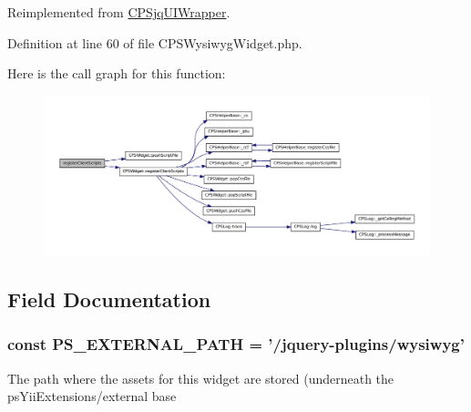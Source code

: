 Reimplemented from \hyperlink{classCPSjqUIWrapper_ac02a66bde8e72e4909137bf748edf665}{CPSjqUIWrapper}.



Definition at line 60 of file CPSWysiwygWidget.php.








Here is the call graph for this function:\nopagebreak
\begin{figure}[H]
\begin{center}
\leavevmode
\includegraphics[width=400pt]{classCPSWysiwygWidget_ac02a66bde8e72e4909137bf748edf665_cgraph}
\end{center}
\end{figure}




\subsection{Field Documentation}
\hypertarget{classCPSWysiwygWidget_a8ccb5e1d65c091f944a6aa8c5be834ca}{
\subsubsection[{PS\_\-EXTERNAL\_\-PATH}]{\setlength{\rightskip}{0pt plus 5cm}const {\bf PS\_\-EXTERNAL\_\-PATH} = '/jquery-\/plugins/wysiwyg'}}
\label{classCPSWysiwygWidget_a8ccb5e1d65c091f944a6aa8c5be834ca}
The path where the assets for this widget are stored (underneath the psYiiExtensions/external base 

